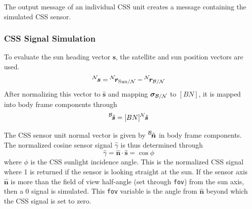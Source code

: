 The output message of an individual CSS unit creates a message containing the simulated CSS sensor.


\subsubsection{CSS Signal Simulation}
To evaluate the sun heading vector $\bm s$, the satellite and sun position vectors are used.
\begin{equation}
	\leftexp{N}{\bm s} = \leftexp{N}{\bm r}_{\mathrm{Sun}/\mathcal{N}} - \leftexp{N}{\bm r}_{\cal B/N}
\end{equation}
After normalizing this vector to $\hat{\bm s}$ and mapping $\bm\sigma_{\cal B/N}$ to $[BN]$, it is mapped into body frame components through
\begin{equation}
	\leftexp{B}{\hat{\bm s}} = [BN] \leftexp{N}{\hat{\bm s}}
\end{equation}

The CSS sensor unit normal vector is given by $\leftexp{B}{\hat{\bm n}}$ in body frame components.  The normalized cosine sensor signal $\hat\gamma$ is thus determined through
\begin{equation}
	\hat \gamma = \hat{\bm n} \cdot \hat{\bm s} = \cos\phi
\end{equation}
where $\phi$ is the CSS sunlight incidence angle.  
This is the normalized CSS signal where 1 is returned if the sensor is looking straight at the sun.  If the sensor axis $\hat{\bm n}$ is more than the field of view half-angle (set through {\tt fov}) from the sun axis, then a 0 signal is simulated.  This {\tt fov} variable is the angle from $\hat{\bm n}$ beyond which the CSS signal is set to zero.  

